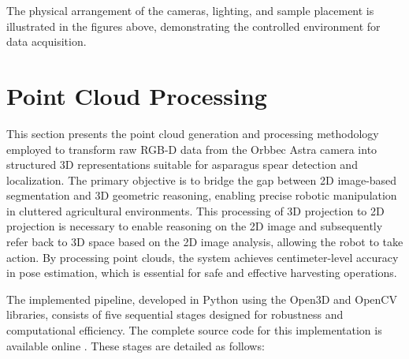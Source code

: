 The physical arrangement of the cameras, lighting, and sample placement is illustrated in the figures above, 
demonstrating the controlled environment for data acquisition.

\section{Point Cloud Processing}

This section presents the point cloud generation and processing methodology employed to transform raw RGB-D data 
from the Orbbec Astra camera into structured 3D representations suitable for asparagus spear detection and 
localization. The primary objective is to bridge the gap between 2D image-based segmentation and 3D geometric 
reasoning, enabling precise robotic manipulation in cluttered agricultural environments. This processing of 3D 
projection to 2D projection is necessary to enable reasoning on the 2D image and subsequently refer back to 3D 
space based on the 2D image analysis, allowing the robot to take action.
By processing point clouds, the system achieves centimeter-level accuracy in pose estimation, which is 
essential for safe and effective harvesting operations.

The implemented pipeline, developed in Python using the Open3D and OpenCV libraries, consists of five 
sequential stages designed for robustness and computational efficiency. The complete source code for 
this implementation is available online \cite{cloudprocessor}. These stages are detailed as follows:

